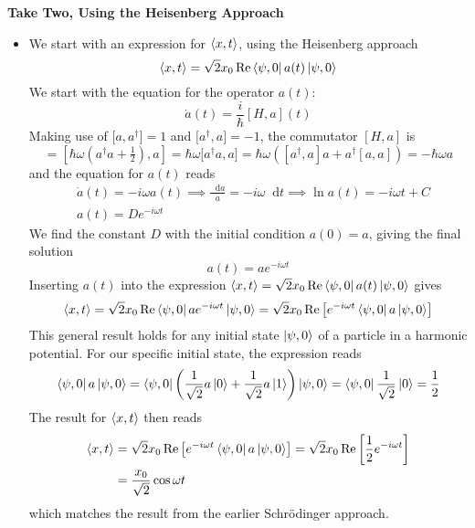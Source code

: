 \documentclass[11pt, a4paper]{article}
\newcommand{\diff}{\mathop{}\!\mathrm{d}} %
\newcommand{\schro}{Schr\"{o}dinger\xspace}
\begin{document}
\textbf{Take Two, Using the Heisenberg Approach}
\begin{itemize}
	\item We start with an expression for $ \ev{x, t} $, using the Heisenberg approach
	\begin{equation*}
		\ev{x, t} = \sqrt{2}x_{0} \Re \bra{\psi, 0}a(t) \ket{\psi, 0}
	\end{equation*}
	We start with the equation for the operator $ a(t) $: 
	\begin{equation*}
		\dot{a}(t) = \frac{i}{\hbar}[H, a](t)
	\end{equation*}
	Making use of $ \big[a, a^{\dagger}\big] = 1 $ and $ \big[ a^{\dagger}, a\big] = -1 $, the commutator $ [H, a] $ is
	\begin{equation*}
		[H, a] = [\hbar \omega (a^{\dagger}a + \tfrac{1}{2}), a] = \hbar \omega \big[a^{\dagger}a, a\big] = \hbar \omega \left([a^{\dagger}, a]a + a^{\dagger}[a, a]\right) = -\hbar \omega a
	\end{equation*}
	and the equation for $ a(t) $ reads
	\begin{align*}
		&\dot{a}(t) = -i \omega a(t) \implies \frac{\diff a}{a} = -i\omega \diff t \implies \ln a(t) = -i\omega t + C\\
		&a(t) = De^{-i\omega t}
	\end{align*}
	We find the constant $ D $ with the initial condition $ a(0) = a $, giving the final solution 
	\begin{equation*}
		a(t) = ae^{-i\omega t}
	\end{equation*}
	Inserting $ a(t) $ into the expression $ \ev{x, t} = \sqrt{2}x_{0} \Re \bra{\psi, 0}a(t) \ket{\psi, 0} $ gives
	\begin{equation*}
		\ev{x, t} = \sqrt{2}x_{0} \Re \bra{\psi, 0}ae^{-i\omega t} \ket{\psi, 0} = \sqrt{2}x_{0} \Re \left[e^{-i\omega t} \bra{\psi, 0}a \ket{\psi, 0}\right]
	\end{equation*}
	This general result holds for any initial state $ \ket{\psi, 0} $ of a particle in a harmonic potential. For our specific initial state, the expression reads
	\begin{equation*}
		\bra{\psi, 0}a \ket{\psi, 0} = 	\bra{\psi, 0} \left(\frac{1}{\sqrt{2}}a \ket{0} + \frac{1}{\sqrt{2}}a\ket{1} \right) \ket{\psi, 0}  =	\bra{\psi, 0} \frac{1}{\sqrt{2}} \ket{0} = \frac{1}{2}
	\end{equation*}
	The result for $ \ev{x, t} $ then reads
	\begin{align*}
		\ev{x, t} &= \sqrt{2}x_{0} \Re \left[e^{-i\omega t} \bra{\psi, 0}a \ket{\psi, 0}\right] = \sqrt{2}x_{0} \Re \left[\frac{1}{2} e^{-i\omega t}\right]\\
		&=\frac{x_{0}}{\sqrt{2}}\cos \omega t
	\end{align*}
	which matches the result from the earlier \schro approach. 
\end{itemize}
\end{document}
